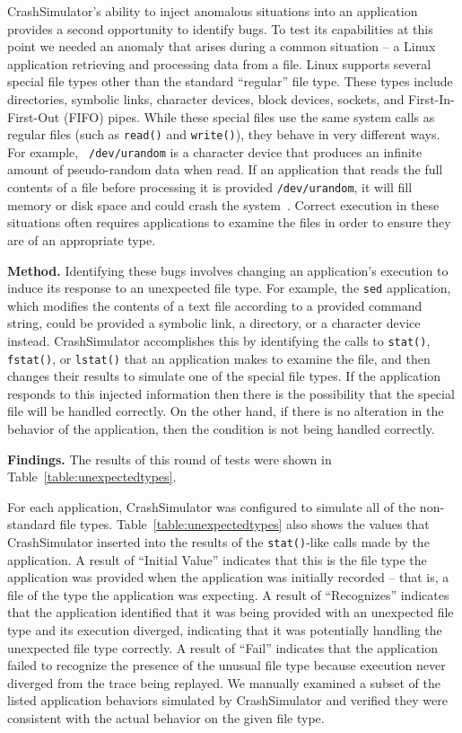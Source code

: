 CrashSimulator's ability
to inject anomalous situations into an application
provides a second opportunity to identify bugs.
To test
its capabilities
at this point we needed
an anomaly
that arises during a common situation --
a Linux application retrieving
and processing data from a file.  Linux supports several special file
types other than the standard ``regular'' file type.
These types include
directories,
symbolic links,
character devices,
block devices,
sockets, and
First-In-First-Out (FIFO) pipes.
While these special files
use the same system calls as regular files (such as {\tt read()} and
{\tt write()}), they behave in very different ways.  For example, {\tt
/dev/urandom} is a character device that produces an infinite amount of
pseudo-random data when read.  If an application that reads the full
contents of a file before processing it is provided {\tt /dev/urandom}, it
will fill memory or disk space and could
crash the system~\cite{YumAptEndless}.
Correct execution in these situations often requires applications
to examine the files in order to ensure they are of an appropriate type.

{\bf Method.}  Identifying these bugs involves changing an application's
execution to induce its response to an unexpected file type.  For
example, the {\tt sed} application, which modifies the contents of a text
file according to a provided command string, could be provided a symbolic
link, a directory, or a character device instead.  CrashSimulator
accomplishes this by identifying the calls to {\tt stat()}, {\tt fstat()},
or {\tt lstat()} that an application makes to examine the file, and then
changes their results to simulate
one of the special file types.  If the application responds to
this injected information then there is the possibility that the special
file will be handled correctly.  On the other hand, if there is no
alteration in the behavior of the application,  then the condition is not
being handled correctly.

{\bf Findings.}
The results of this round of tests were shown in
Table~\ref{table:unexpectedtypes}.

For each application,
CrashSimulator was configured to simulate all of the non-standard file
types.
Table~\ref{table:unexpectedtypes} also shows the values that CrashSimulator
inserted into the results of the {\tt stat()}-like calls made by the
application.
A result of ``Initial Value'' indicates
that this is the file type the application was provided
when the application was initially recorded -- that is,
a file of the type the application was expecting.
A result of ``Recognizes'' indicates that the application
identified that it was being provided with an unexpected file type and its
execution diverged,
indicating that it was potentially handling the
unexpected file type correctly.
A result of ``Fail'' indicates that the
application failed to recognize the presence of the unusual file type
because execution never diverged from the trace being replayed.
We manually examined a subset of the listed application behaviors simulated by
CrashSimulator and verified they were consistent with the actual behavior
on the given file type.

